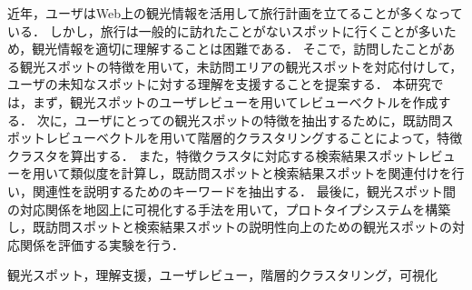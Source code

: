 \documentclass{deimj}
\begin{document}
\pagestyle{empty}
\begin{jabstract}
近年，ユーザはWeb上の観光情報を活用して旅行計画を立てることが多くなっている．
しかし，旅行は一般的に訪れたことがないスポットに行くことが多いため，観光情報を適切に理解することは困難である．
そこで，訪問したことがある観光スポットの特徴を用いて，未訪問エリアの観光スポットを対応付けして，ユーザの未知なスポットに対する理解を支援することを提案する．
本研究では，まず，観光スポットのユーザレビューを用いてレビューベクトルを作成する．
次に，ユーザにとっての観光スポットの特徴を抽出するために，既訪問スポットレビューベクトルを用いて階層的クラスタリングすることによって，特徴クラスタを算出する．
また，特徴クラスタに対応する検索結果スポットレビューを用いて類似度を計算し，既訪問スポットと検索結果スポットを関連付けを行い，関連性を説明するためのキーワードを抽出する．
最後に，観光スポット間の対応関係を地図上に可視化する手法を用いて，プロトタイプシステムを構築し，既訪問スポットと検索結果スポットの説明性向上のための観光スポットの対応関係を評価する実験を行う．

\end{jabstract}

\begin{jkeyword}
観光スポット，理解支援，ユーザレビュー，階層的クラスタリング，可視化
\end{jkeyword}
\maketitle

\end{document}
